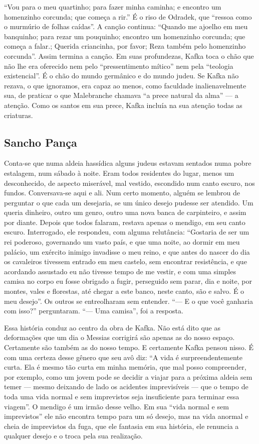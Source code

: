 ``Vou para o meu quartinho; para fazer minha caminha; e encontro um
homenzinho corcunda; que começa a rir.'' É o riso de Odradek, que
``ressoa como o murmúrio de folhas caídas''. A canção continua: ``Quando
me ajoelho em meu banquinho; para rezar um pouquinho; encontro um
homenzinho corcunda; que começa a falar.; Querida criancinha, por favor;
Reza também pelo homenzinho corcunda''. Assim termina a canção. Em suas
profundezas, Kafka toca o chão que não lhe era oferecido nem pelo
``pressentimento mítico'' nem pela ``teologia existencial''. É o chão do
mundo germânico e do mundo judeu. Se Kafka não rezava, o que ignoramos,
era capaz ao menos, como faculdade inalienavelmente sua, de praticar o
que Malebranche chamava ``a prece natural da alma'' --- a atenção. Como
os santos em sua prece, Kafka incluía na sua atenção todas as criaturas.

\subsection{Sancho Pança}

Conta-se que numa aldeia hassídica alguns judeus estavam sentados numa
pobre estalagem, num sábado à noite. Eram todos residentes do lugar,
menos um desconhecido, de aspecto miserável, mal vestido, escondido num
canto escuro, nos fundos. Conversava-se aqui e ali. Num certo momento,
alguém se lembrou de perguntar o que cada um desejaria, se um único
desejo pudesse ser atendido. Um queria dinheiro, outro um genro, outro
uma nova banca de carpinteiro, e assim por diante. Depois que todos
falaram, restava apenas o mendigo, em seu canto escuro. Interrogado, ele
respondeu, com alguma relutância: ``Gostaria de ser um rei poderoso,
governando um vasto país, e que uma noite, ao dormir em meu palácio, um
exército inimigo invadisse o meu reino, e que antes do nascer do dia os
cavaleiros tivessem entrado em meu castelo, sem encontrar resistência, e
que acordando assustado eu não tivesse tempo de me vestir, e com uma
simples camisa no corpo eu fosse obrigado a fugir, perseguido sem parar,
dia e noite, por montes, vales e florestas, até chegar a este banco,
neste canto, são e salvo. É o meu desejo''. Os outros se entreolharam
sem entender. ``--- E o que você ganharia com isso?'' perguntaram. ``---
Uma camisa'', foi a resposta.

Essa história conduz ao centro da obra de Kafka. Não está dito que as
deformações que um dia o Messias corrigirá são apenas as do nosso
espaço. Certamente são também as do nosso tempo. E certamente Kafka
pensou nisso. É com uma certeza desse gênero que seu avô diz: ``A vida é
surpreendentemente curta. Ela é mesmo tão curta em minha memória, que
mal posso compreender, por exemplo, como um jovem pode se decidir a
viajar para a próxima aldeia sem temer --- mesmo deixando de lado os
acidentes imprevisíveis --- que o tempo de toda uma vida normal e sem
imprevistos seja insuficiente para terminar essa viagem''. O mendigo é
um irmão desse velho. Em sua ``vida normal e sem imprevistos'' ele não
encontra tempo para um só desejo, mas na vida anormal e cheia de
imprevistos da fuga, que ele fantasia em sua história, ele renuncia a
qualquer desejo e o troca pela sua realização.

